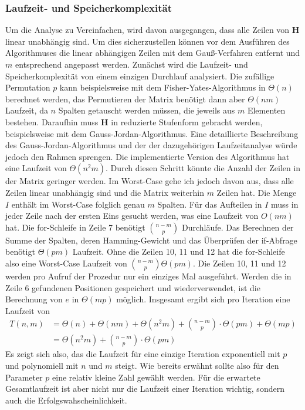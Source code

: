 \documentclass[a4paper,10pt,ngerman]{scrartcl}
\begin{document}
\subsubsection{Laufzeit- und Speicherkomplexität}
Um die Analyse zu Vereinfachen, wird davon ausgegangen, dass alle Zeilen von $\mathbf{H}$ linear unabhängig sind. Um dies sicherzustellen können vor dem Ausführen des Algorithmuses die linear abhängigen Zeilen mit dem Gauß-Verfahren entfernt und $m$ entsprechend angepasst werden. 
Zunächst wird die Laufzeit- und Speicherkomplexität von einem einzigen Durchlauf analysiert. 
Die zufällige Permutation $p$ kann beispielsweise mit dem Fisher-Yates-Algorithmus in $\Theta(n)$ berechnet werden, das Permutieren der Matrix benötigt dann aber $\Theta(nm)$ Laufzeit, da $n$ Spalten getauscht werden müssen, die jeweils aus $m$ Elementen bestehen.
Daraufhin muss $\mathbf{H}$ in reduzierte Stufenform gebracht werden, beispielsweise mit dem Gauss-Jordan-Algorithmus. 
Eine detaillierte Beschreibung des Gauss-Jordan-Algorithmus und der der dazugehörigen Laufzeitanalyse würde jedoch den Rahmen sprengen.
Die implementierte Version des Algorithmus hat eine Laufzeit von $\Theta(n^2m)$.
Durch diesen Schritt könnte die Anzahl der Zeilen in der Matrix geringer werden. 
Im Worst-Case gehe ich jedoch davon aus, dass alle Zeilen linear unabhängig sind und die Matrix weiterhin $m$ Zeilen hat. 
Die Menge $I$ enthält im Worst-Case folglich genau $m$ Spalten.
Für das Aufteilen in $I$ muss in jeder Zeile nach der ersten Eins gesucht werden, was eine Laufzeit von $O(nm)$ hat.
Die for-Schleife in Zeile 7 benötigt $\binom{n-m}{p}$ Durchläufe.
Das Berechnen der Summe der Spalten, deren Hamming-Gewicht und das Überprüfen der if-Abfrage benötigt $\Theta(pm)$ Laufzeit. 
Ohne die Zeilen 10, 11 und 12 hat die for-Schleife also eine Worst-Case Laufzeit von $\binom{n-m}{p}\Theta(pm)$.
Die Zeilen 10, 11 und 12 werden pro Aufruf der Prozedur nur ein einziges Mal ausgeführt. Werden die in Zeile 6 gefundenen Positionen gespeichert und wiederverwendet, ist die Berechnung von $e$ in $\Theta(mp)$ möglich. 
Insgesamt ergibt sich pro Iteration eine Laufzeit von 
\begin{align*}
    T(n, m) &= \Theta(n) + \Theta(nm) + \Theta(n^2m) + \binom{n-m}{p} \cdot \Theta(pm) + \Theta(mp)\\
            &= \Theta(n^2m) + \binom{n-m}{p}\cdot \Theta(pm)
\end{align*}
Es zeigt sich also, das die Laufzeit für eine einzige Iteration exponentiell mit $p$ und polynomiell mit $n$ und $m$ steigt. Wie bereits erwähnt sollte also für den Parameter $p$ eine relativ kleine Zahl gewählt werden.
Für die erwartete Gesamtlaufzeit ist aber nicht nur die Laufzeit einer Iteration wichtig, sondern auch die Erfolgswahscheinlichkeit.
\end{document}
